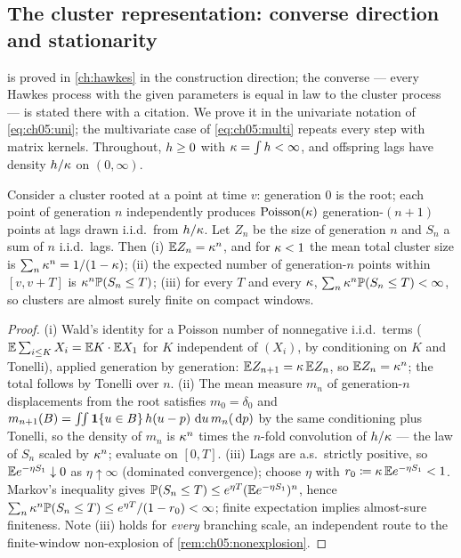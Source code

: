 \subsection{The cluster representation: converse direction and stationarity}

 is proved in \cref{ch:hawkes} in the construction direction; the converse ---
every Hawkes process with the given parameters is equal in law to the cluster process --- is stated
there with a citation. We prove it in the univariate notation of \cref{eq:ch05:uni}; the multivariate
case of \cref{eq:ch05:multi} repeats every step with matrix kernels. Throughout, $h \ge 0$ with
$\kappa = \int h < \infty$, and offspring lags have density $h/\kappa$ on $(0,\infty)$.
\begin{lemma}
\label{app:pf:branching}
Consider a cluster rooted at a point at time $v$: generation $0$ is the root; each point of generation
$n$ independently produces $\mathrm{Poisson}(\kappa)$ generation-$(n{+}1)$ points at lags drawn
i.i.d.\ from $h/\kappa$. Let $Z_n$ be the size of generation $n$ and $S_n$ a sum of $n$ i.i.d.\
lags. Then (i) $\mathbb{E} Z_n = \kappa^n$, and for $\kappa < 1$ the mean total cluster size is $\sum_n
\kappa^n = 1/(1-\kappa)$; (ii) the expected number of generation-$n$ points within $[v, v+T]$ is
$\kappa^n \mathbb{P}(S_n \le T)$; (iii) for every $T$ and every $\kappa$, $\sum_n \kappa^n \mathbb{P}(S_n \le
T) < \infty$, so clusters are almost surely finite on compact windows.
\end{lemma}
\begin{proof}
(i) Wald's identity for a Poisson number of nonnegative i.i.d.\ terms ($\mathbb{E} \sum_{i \le K} X_i = \mathbb{E} K
\cdot \mathbb{E} X_1$ for $K$ independent of $(X_i)$, by conditioning on $K$ and Tonelli), applied generation
by generation: $\mathbb{E} Z_{n+1} = \kappa\, \mathbb{E} Z_n$, so $\mathbb{E} Z_n = \kappa^n$; the total follows by Tonelli
over $n$. (ii) The mean measure $m_n$ of generation-$n$ displacements from the root satisfies $m_0 =
\delta_0$ and $m_{n+1}(B) = \int\!\!\int \mathbf{1}\{u \in B\}\, h(u - p)\, \,\mathrm{d} u\, m_n(\,\mathrm{d} p)$ by the
same conditioning plus Tonelli, so the density of $m_n$ is $\kappa^n$ times the $n$-fold convolution
of $h/\kappa$ --- the law of $S_n$ scaled by $\kappa^n$; evaluate on $[0, T]$. (iii) Lags are
a.s.\ strictly positive, so $\mathbb{E} e^{-\eta S_1} \downarrow 0$ as $\eta \uparrow \infty$ (dominated
convergence); choose $\eta$ with $r_0 \coloneqq \kappa\, \mathbb{E} e^{-\eta S_1} < 1$. Markov's inequality
gives $\mathbb{P}(S_n \le T) \le e^{\eta T} (\mathbb{E} e^{-\eta S_1})^n$, hence $\sum_n \kappa^n \mathbb{P}(S_n \le T)
\le e^{\eta T}/(1 - r_0) < \infty$; finite expectation implies almost-sure finiteness. Note (iii)
holds for \emph{every} branching scale, an independent route to the finite-window non-explosion of
\cref{rem:ch05:nonexplosion}.
\end{proof}
